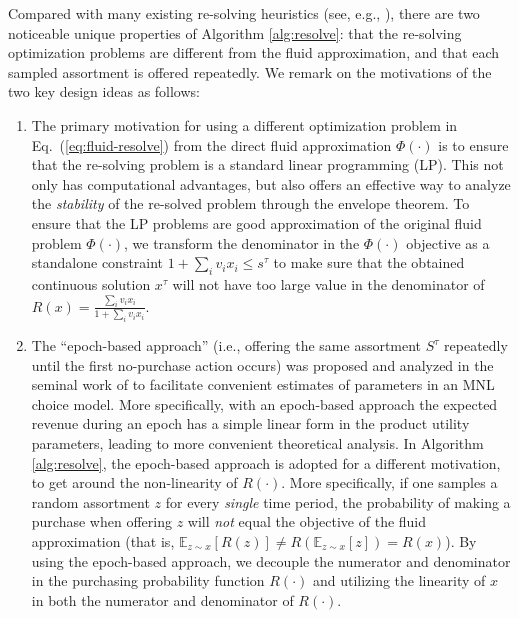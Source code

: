 \documentclass[opre]{informs3aa}
\newcommand{\Authornote}[2]{{\small\textcolor{DSgray}{\sf$<<<${  #1: #2
			}$>>>$}}}
\newcommand{\xnote}[1]{{\Authornote{Xi}{#1}}}
\begin{document}
Compared with many existing re-solving heuristics (see, e.g., \cite{jasin2012re,jasin2014reoptimization}), there are two noticeable 
unique properties of Algorithm \ref{alg:resolve}: that the re-solving optimization problems are different from the fluid approximation,
and that each sampled assortment is offered repeatedly.
We remark on the motivations of the two key design ideas as follows:
\begin{enumerate}
\item The primary motivation for using a different optimization problem in Eq.~(\ref{eq:fluid-resolve}) from the direct fluid approximation $\Phi(\cdot)$
is to ensure that the re-solving problem is a standard linear programming (LP).
This not only has computational advantages, but also offers an effective way to analyze the \emph{stability} of the re-solved problem through the envelope theorem.
To ensure that the LP problems are good approximation of the original fluid problem $\Phi(\cdot)$, we transform the denominator in the $\Phi(\cdot)$ objective
as a standalone constraint $1+\sum_iv_ix_i\leq s^\tau$ to make sure that the obtained continuous solution $x^\tau$ will not have too large value in the denominator of $R(x)=\frac{\sum_i v_ix_i}{1+\sum_i v_ix_i}$.
\item The ``epoch-based approach'' (i.e., offering the same assortment $S^\tau$ repeatedly until the first no-purchase action occurs) was proposed
and analyzed in the seminal work of \cite{agrawal2019mnl} to facilitate convenient estimates of parameters in an MNL choice model.
More specifically, with an epoch-based approach the expected revenue during an epoch has a simple linear form in the product utility parameters,
leading to more convenient theoretical analysis.
In Algorithm \ref{alg:resolve}, the epoch-based approach is adopted for a different motivation, to get around the non-linearity of $R(\cdot)$.
More specifically, if one samples a random assortment $z$ for every \emph{single} time period, the {probability of making a purchase when offering} $z$ will \emph{not} equal
the objective of the fluid approximation (that is, $\mathbb E_{z\sim x}[R(z)]\neq R(\mathbb E_{z\sim x}[z]) = R(x)$).
By using the epoch-based approach, we decouple the numerator and denominator in the purchasing probability function $R(\cdot)$ and utilizing
the linearity of $x$ in both the numerator and denominator of $R(\cdot)$.
\end{enumerate}
\end{document}
